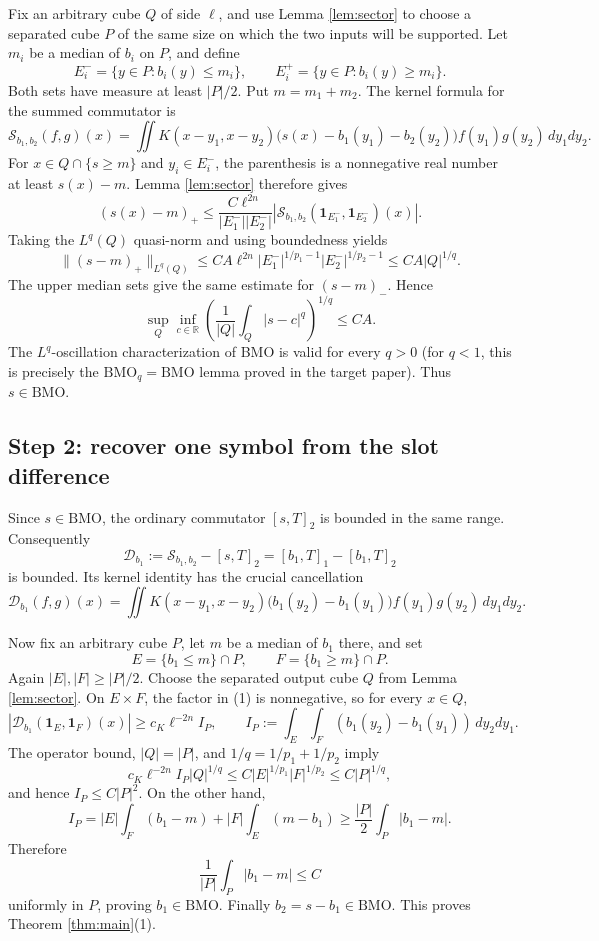 \documentclass[11pt]{article}
\newcommand{\BMO}{\mathrm{BMO}}
\newcommand{\R}{\mathbb R}
\newcommand{\1}{\mathbf 1}
\begin{document}
Fix an arbitrary cube \(Q\) of side \(\ell\), and use Lemma
\ref{lem:sector} to choose a separated cube \(P\) of the same size on which
the two inputs will be supported.  Let \(m_i\) be a median of \(b_i\) on
\(P\), and define
\[
 E_i^- =\{y\in P:b_i(y)\le m_i\},\qquad
 E_i^+ =\{y\in P:b_i(y)\ge m_i\}.
\]
Both sets have measure at least \(|P|/2\).  Put \(m=m_1+m_2\).  The kernel
formula for the summed commutator is
\[
 \mathcal S_{b_1,b_2}(f,g)(x)
 =\iint K(x-y_1,x-y_2)
 \bigl(s(x)-b_1(y_1)-b_2(y_2)\bigr)f(y_1)g(y_2)\,dy_1dy_2.
\]
For \(x\in Q\cap\{s\ge m\}\) and \(y_i\in E_i^-\), the parenthesis is a
nonnegative real number at least \(s(x)-m\).  Lemma \ref{lem:sector} therefore
gives
\[
 (s(x)-m)_+
 \le \frac{C\ell^{2n}}{|E_1^-||E_2^-|}
 \left|\mathcal S_{b_1,b_2}(\1_{E_1^-},\1_{E_2^-})(x)\right|.
\]
Taking the \(L^q(Q)\) quasi-norm and using boundedness yields
\[
 \|(s-m)_+\|_{L^q(Q)}
 \le C A\ell^{2n}|E_1^-|^{1/p_1-1}|E_2^-|^{1/p_2-1}
 \le CA|Q|^{1/q}.
\]
The upper median sets give the same estimate for \((s-m)_-\).  Hence
\[
 \sup_Q\inf_{c\in\R}
 \left(\frac1{|Q|}\int_Q|s-c|^q\right)^{1/q}\le CA.
\]
The \(L^q\)-oscillation characterization of BMO is valid for every
\(q>0\) (for \(q<1\), this is precisely the \(\BMO_q=\BMO\) lemma proved in
the target paper).  Thus \(s\in\BMO\).

\subsection*{Step 2: recover one symbol from the slot difference}

Since \(s\in\BMO\), the ordinary commutator \([s,T]_2\) is bounded in the
same range.  Consequently
\[
 \mathcal D_{b_1}:=\mathcal S_{b_1,b_2}-[s,T]_2
 =[b_1,T]_1-[b_1,T]_2
\]
is bounded.  Its kernel identity has the crucial cancellation
\[
 \mathcal D_{b_1}(f,g)(x)
 =\iint K(x-y_1,x-y_2)
       \bigl(b_1(y_2)-b_1(y_1)\bigr)f(y_1)g(y_2)\,dy_1dy_2.       \tag{1}
\]

Now fix an arbitrary cube \(P\), let \(m\) be a median of \(b_1\) there,
and set
\[
 E=\{b_1\le m\}\cap P,\qquad F=\{b_1\ge m\}\cap P.
\]
Again \(|E|,|F|\ge|P|/2\).  Choose the separated output cube \(Q\) from
Lemma \ref{lem:sector}.  On \(E\times F\), the factor in (1) is nonnegative,
so for every \(x\in Q\),
\[
 |\mathcal D_{b_1}(\1_E,\1_F)(x)|
 \ge c_K\ell^{-2n} I_P,
 \qquad
 I_P:=\int_E\int_F(b_1(y_2)-b_1(y_1))\,dy_2dy_1.
\]
The operator bound, \(|Q|=|P|\), and
\(1/q=1/p_1+1/p_2\) imply
\[
 c_K\ell^{-2n}I_P|Q|^{1/q}
 \le C|E|^{1/p_1}|F|^{1/p_2}
 \le C|P|^{1/q},
\]
and hence \(I_P\le C|P|^2\).  On the other hand,
\[
 I_P
 =|E|\int_F(b_1-m)+|F|\int_E(m-b_1)
 \ge \frac{|P|}{2}\int_P|b_1-m|.
\]
Therefore
\[
 \frac1{|P|}\int_P|b_1-m|\le C
\]
uniformly in \(P\), proving \(b_1\in\BMO\).  Finally
\(b_2=s-b_1\in\BMO\).  This proves Theorem \ref{thm:main}(1).
\end{document}
